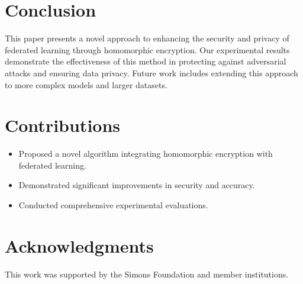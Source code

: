 \documentclass{article}
\begin{document}
\section{Conclusion}
This paper presents a novel approach to enhancing the security and privacy of federated learning through homomorphic encryption. Our experimental results demonstrate the effectiveness of this method in protecting against adversarial attacks and ensuring data privacy. Future work includes extending this approach to more complex models and larger datasets.

\section{Contributions}
\begin{itemize}
    \item Proposed a novel algorithm integrating homomorphic encryption with federated learning.
    \item Demonstrated significant improvements in security and accuracy.
    \item Conducted comprehensive experimental evaluations.
\end{itemize}

\section*{Acknowledgments}
This work was supported by the Simons Foundation and member institutions.



\end{document}

